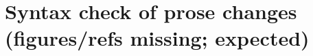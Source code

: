 \documentclass[11pt,a4paper]{article}
\begin{document}
\section*{Syntax check of prose changes (figures/refs missing; expected)}





\end{document}
